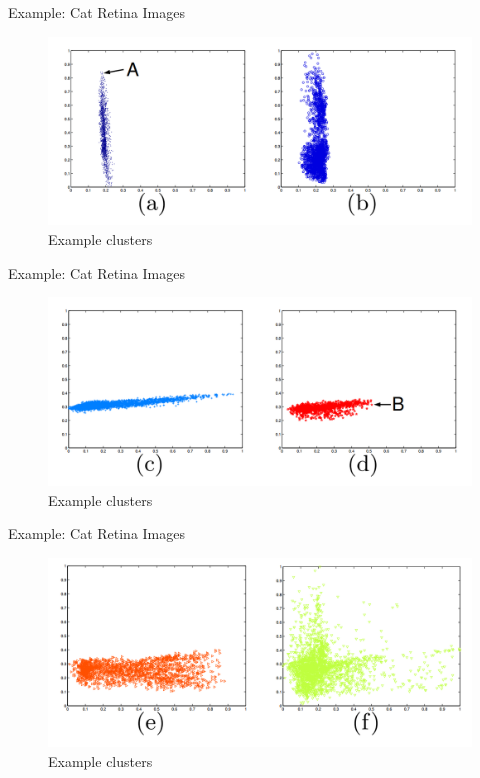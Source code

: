\documentclass{beamer}
\begin{document}
  \note{}
  
  \begin{frame}{Example: Cat Retina Images}{}
    \begin{figure}
      \centering
      \includegraphics[width=\linewidth]{imgs/cat2}
      \caption[]{Example clusters\cite{Bohm2006-ts}}
      \label{fig:cat2}
    \end{figure}    
  \end{frame}
  
  \note{}
  
  \setcounter{figure}{7}
  
  \begin{frame}{Example: Cat Retina Images}{}
    \begin{figure}
      \centering
      \includegraphics[width=\linewidth]{imgs/cat3}
      \caption[]{Example clusters\cite{Bohm2006-ts}}
      \label{fig:cat3}
    \end{figure}    
  \end{frame}
  
  \note{}
  
  \setcounter{figure}{7}
  
  \begin{frame}{Example: Cat Retina Images}{}
    \begin{figure}
      \centering
      \includegraphics[width=\linewidth]{imgs/cat4}
      \caption[]{Example clusters\cite{Bohm2006-ts}}
      \label{fig:cat4}
    \end{figure}    
  \end{frame}
  
\end{document}
